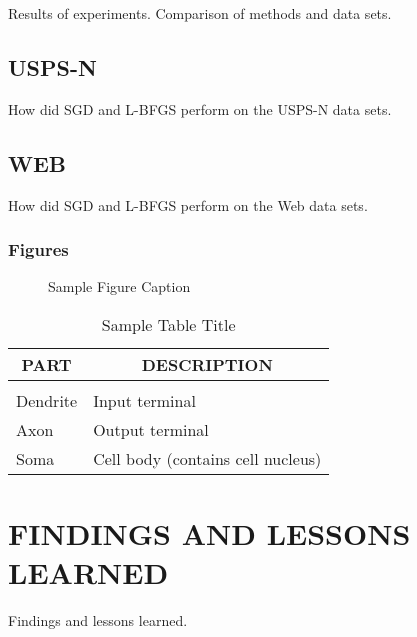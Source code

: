Results of experiments. Comparison of methods and data sets.

\subsection{USPS-N}
How did SGD and L-BFGS perform on the USPS-N data sets.

\subsection{WEB}
How did SGD and L-BFGS perform on the Web data sets.


\subsubsection{Figures} 

\begin{figure}[h]
\vspace{1in}
\caption{Sample Figure Caption}
\end{figure}

\begin{table}[t]
\caption{Sample Table Title}
\label{sample-table}
\begin{center}
\begin{tabular}{ll}
\multicolumn{1}{c}{\bf PART}  &\multicolumn{1}{c}{\bf DESCRIPTION}
\\ \hline \\
Dendrite         &Input terminal \\
Axon             &Output terminal \\
Soma             &Cell body (contains cell nucleus) \\
\end{tabular}
\end{center}
\end{table}



\section{FINDINGS AND LESSONS LEARNED}
\label{sec:conclusion}

Findings and lessons learned.








